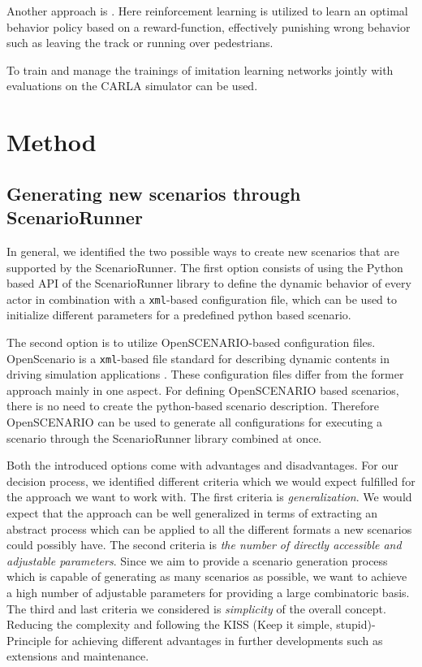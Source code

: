 \documentclass[conference, 11pt]{IEEEtran}
\begin{document}
Another approach is  \cite{Toromanoff_2020_CVPR}. Here reinforcement learning is utilized to learn an optimal behavior policy based on a reward-function, effectively punishing wrong behavior such as leaving the track or running over pedestrians.

To train and manage the trainings of imitation learning networks jointly with evaluations on the CARLA simulator  \cite{felipecode:coiltraine} can be used.

\section{Method}

\subsection{Generating new scenarios through ScenarioRunner}
In general, we identified the two possible ways to create new scenarios that are supported by the ScenarioRunner.
The first option consists of using the Python based API of the ScenarioRunner library to define the dynamic behavior of every actor in combination with a \texttt{xml}-based configuration file, which can be used to initialize different parameters for a predefined python based scenario.

The second option is to utilize OpenSCENARIO-based configuration files. OpenScenario is a \texttt{xml}-based file standard for describing dynamic contents in driving simulation applications \cite{OpenScenario}. These configuration files differ from the former approach mainly in one aspect. For defining OpenSCENARIO based scenarios, there is no need to create the python-based scenario description. Therefore OpenSCENARIO can be used to generate all configurations for executing a scenario through the ScenarioRunner library combined at once. 

Both the introduced options come with advantages and disadvantages. For our decision process, we identified different criteria which we would expect fulfilled for the approach we want to work with. 
The first criteria is \textit{generalization}. We would expect that the approach can be well generalized in terms of  extracting an abstract process which can be applied to all the different formats a new scenarios could possibly have.
The second criteria is \textit{the number of directly accessible and adjustable parameters}. Since we aim to provide a scenario generation process which is capable of generating as many scenarios as possible, we want to achieve a high number of adjustable parameters for providing a large combinatoric basis.
The third and last criteria we considered is \textit{simplicity} of the overall concept. Reducing the complexity and  following the KISS (Keep it simple, stupid)-Principle for achieving different advantages in further developments such as extensions and maintenance. 
\end{document}
